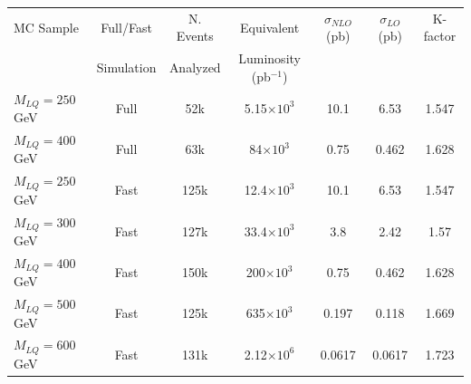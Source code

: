 \begin{table}[htb]
  \label{tab:NumEvents}
  \begin{center}
\small
    \begin{tabular}{|l|cccccc|} \hline\hline
      MC Sample                   & Full/Fast & N. Events & Equivalent             & $\sigma_{NLO}$ (pb) & $\sigma_{LO}$ (pb) & K-factor \\
                                  & Simulation& Analyzed  & Luminosity (pb$^{-1}$)   &                     &                    &    \\ 
\hline\hline
      $M_{LQ}=250~$GeV            & Full      & 52k       &    5.15$\times 10^3$   & 10.1                & 6.53               & 1.547\\
      $M_{LQ}=400~$GeV            & Full      & 63k       &      84$\times 10^3$   &  0.75		 & 0.462	      & 1.628\\ 
\hline
      $M_{LQ}=250~$GeV            & Fast      & 125k      &    12.4$\times 10^3$   & 10.1		 & 6.53		      & 1.547\\
      $M_{LQ}=300~$GeV            & Fast      & 127k      &    33.4$\times 10^3$   &  3.8	         & 2.42		      & 1.57\\
      $M_{LQ}=400~$GeV            & Fast      & 150k      &     200$\times 10^3$   &  0.75	         & 0.462	      & 1.628\\
      $M_{LQ}=500~$GeV            & Fast      & 125k      &     635$\times 10^3$   &  0.197  	         & 0.118	      & 1.669\\
      $M_{LQ}=600~$GeV            & Fast      & 131k      &    2.12$\times 10^6$   &  0.0617             & 0.0617             & 1.723\\

\end{tabular}
\end{center}
\end{table}
